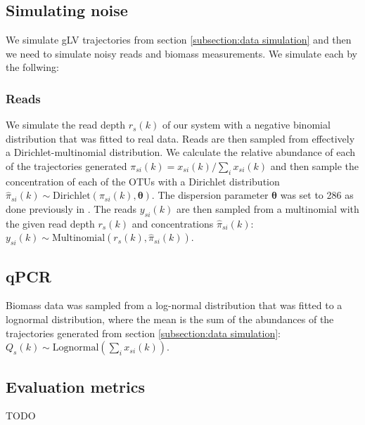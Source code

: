 \documentclass{article}
\newcommand{\Multinomialdist}{\text{Multinomial}}
\newcommand{\concc}{\mathbf{\theta}}
\begin{document}
  \subsection{Simulating noise}
  We simulate gLV trajectories from section \ref{subsection:data simulation} and then we need to simulate noisy reads and biomass measurements. We simulate each by the follwing:

    \subsubsection{Reads}
    We simulate the read depth $r_s(k)$ of our system with a negative binomial distribution that was fitted to real data. Reads are then sampled from effectively a Dirichlet-multinomial distribution. We calculate the relative abundance of each of the trajectories generated $\pi_{si}(k) = x_{si}(k)/\sum_i x_{si}(k)$ and then sample the concentration of each of the OTUs with a Dirichlet distribution $\hat{\pi}_{si}(k) \sim \text{Dirichlet}(\pi_{si}(k), \concc)$. The dispersion parameter $\concc$ was set to 286 as done previously in \cite{cite:MDSINE}. The reads $y_{si}(k)$ are then sampled from a multinomial with the given read depth $r_s(k)$ and concentrations $\hat{\pi}_{si}(k)$: $y_{si}(k) \sim \Multinomialdist(r_s(k), \hat{\pi}_{si}(k))$.

    \subsection{qPCR}
    Biomass data was sampled from a log-normal distribution that was fitted to a lognormal distribution, where the mean is the sum of the abundances of the trajectories generated from section \ref{subsection:data simulation}: $Q_s(k) \sim \text{Lognormal}(\sum_i x_{si}(k))$.


  \subsection{Evaluation metrics}
  TODO
\end{document}

